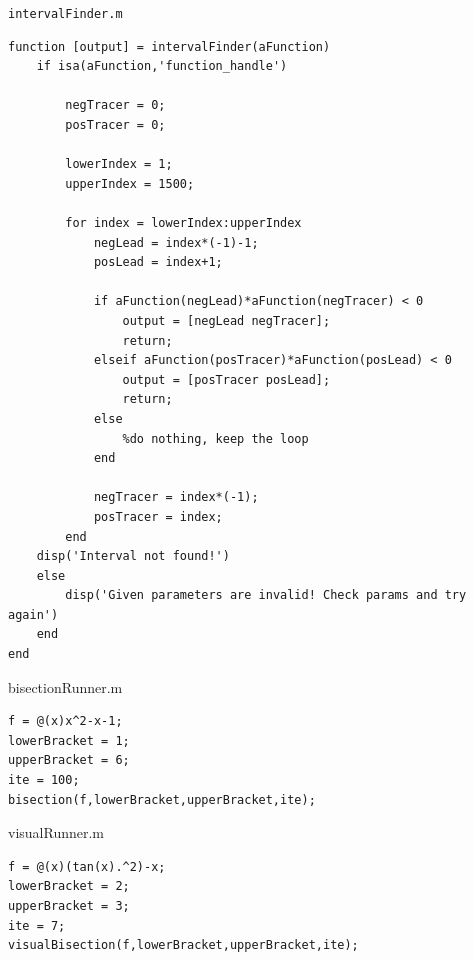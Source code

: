 \documentclass[english,notitlepage,letterpaper, 10pt]{article} %
\begin{document}
\texttt{intervalFinder.m}
\begin{lstlisting}
function [output] = intervalFinder(aFunction)
    if isa(aFunction,'function_handle')

        negTracer = 0;
        posTracer = 0;
        
        lowerIndex = 1;
        upperIndex = 1500;
        
        for index = lowerIndex:upperIndex        
            negLead = index*(-1)-1;
            posLead = index+1;
            
            if aFunction(negLead)*aFunction(negTracer) < 0
                output = [negLead negTracer];
                return;
            elseif aFunction(posTracer)*aFunction(posLead) < 0
                output = [posTracer posLead];
                return;
            else
                %do nothing, keep the loop
            end

            negTracer = index*(-1);
            posTracer = index;
        end
    disp('Interval not found!')    
    else
        disp('Given parameters are invalid! Check params and try again')
    end
end
\end{lstlisting}

bisectionRunner.m
\begin{lstlisting}
f = @(x)x^2-x-1;
lowerBracket = 1;
upperBracket = 6;
ite = 100;
bisection(f,lowerBracket,upperBracket,ite);
\end{lstlisting}

visualRunner.m
\begin{lstlisting}
f = @(x)(tan(x).^2)-x;
lowerBracket = 2;
upperBracket = 3;
ite = 7;
visualBisection(f,lowerBracket,upperBracket,ite);
\end{lstlisting}
\end{document}
